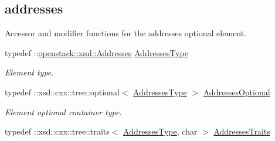 \subsection*{addresses}
\label{_amgrp963e3a2fe559e393bad631f3dc686f69}
Accessor and modifier functions for the addresses optional element. \begin{DoxyCompactItemize}
\item 
\hypertarget{classopenstack_1_1xml_1_1Server_affb12ec58d95b78bdb29bfa5559bbb42}{
typedef ::\hyperlink{classopenstack_1_1xml_1_1Addresses}{openstack::xml::Addresses} \hyperlink{classopenstack_1_1xml_1_1Server_affb12ec58d95b78bdb29bfa5559bbb42}{AddressesType}}
\label{classopenstack_1_1xml_1_1Server_affb12ec58d95b78bdb29bfa5559bbb42}

\begin{DoxyCompactList}\small\item\em Element type. \item\end{DoxyCompactList}\item 
\hypertarget{classopenstack_1_1xml_1_1Server_a61bfe22398061981e800f13759059fbd}{
typedef ::xsd::cxx::tree::optional$<$ \hyperlink{classopenstack_1_1xml_1_1Addresses}{AddressesType} $>$ \hyperlink{classopenstack_1_1xml_1_1Server_a61bfe22398061981e800f13759059fbd}{AddressesOptional}}
\label{classopenstack_1_1xml_1_1Server_a61bfe22398061981e800f13759059fbd}

\begin{DoxyCompactList}\small\item\em Element optional container type. \item\end{DoxyCompactList}\item 
\hypertarget{classopenstack_1_1xml_1_1Server_aa5ec42d2608eca50622460bee2ec0681}{
typedef ::xsd::cxx::tree::traits$<$ \hyperlink{classopenstack_1_1xml_1_1Addresses}{AddressesType}, char $>$ \hyperlink{classopenstack_1_1xml_1_1Server_aa5ec42d2608eca50622460bee2ec0681}{AddressesTraits}}
\label{classopenstack_1_1xml_1_1Server_aa5ec42d2608eca50622460bee2ec0681}


\end{DoxyCompactItemize}
